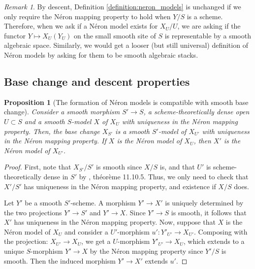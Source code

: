 \documentclass[a4paper,12pt]{amsart} %
\numberwithin{equation}{subsection}
\theoremstyle{definition}
\theoremstyle{plain}%
\newtheorem{proposition}[definition]{Proposition}
\theoremstyle{remark}
\newtheorem{remark}[definition]{Remark}
\begin{document}
\begin{remark}\label{remark:NMs_represent_the_restriction_functor_on_small_smooth_site}
By descent, Definition \ref{definition:neron_models} is unchanged if we only require the Néron mapping property to hold when $Y/S$ is a scheme. Therefore, when we ask if a Néron model exists for $X_U/U$, we are asking if the functor $Y \mapsto X_U(Y_U)$ on the small smooth site of $S$ is representable by a smooth algebraic space. Similarly, we would get a looser (but still universal) definition of Néron models by asking for them to be smooth algebraic stacks.
\end{remark}

\subsection{Base change and descent properties}




\begin{proposition}[The formation of Néron models is compatible with smooth base change]\label{changement de base lisse}
Consider a smooth morphism $S'\to S$, a scheme-theoretically dense open $U\subset S$ and a smooth $S$-model $X$ of $X_U$ with uniqueness in the Néron mapping property. Then, the base change $X_{S'}$ is a smooth $S'$-model of $X_{U'}$ with uniqueness in the Néron mapping property. If $X$ is the Néron model of $X_U$, then $X'$ is the Néron model of $X_{U'}$.
\end{proposition}

\begin{proof}
	First, note that $X_{S'}/S'$ is smooth since $X/S$ is, and that $U'$ is scheme-theoretically dense in $S'$ by \cite{EGA4.3}, théorème 11.10.5. Thus, we only need to check that $X'/S'$ has uniqueness in the Néron mapping property, and existence if $X/S$ does.

	Let $Y'$ be a smooth $S'$-scheme. A morphism $Y' \to X'$ is uniquely determined by the two projections $Y' \to S'$ and $Y' \to X$. Since $Y' \to S$ is smooth, it follows that $X'$ has uniqueness in the Néron mapping property. Now, suppose that $X$ is the Néron model of $X_U$ and consider a $U'$-morphism $u': Y'_{U'}\to X_{U'}$. Composing with the projection: $X_{U'}\to X_U$, we get a $U$-morphism $Y'_{U'}\to X_U$, which extends to a unique $S$-morphism $Y'\to X$ by the Néron mapping property since $Y'/S$ is smooth. Then the induced morphism $Y'\to X'$ extends $u'$.
\end{proof}
\end{document}
